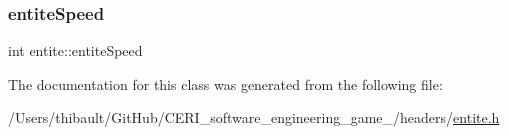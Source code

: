 \subsubsection{\texorpdfstring{entite\+Speed}{entiteSpeed}}
{\footnotesize\ttfamily int entite\+::entite\+Speed\hspace{0.3cm}{\ttfamily [protected]}}



The documentation for this class was generated from the following file\+:\begin{DoxyCompactItemize}
\item 
/\+Users/thibault/\+Git\+Hub/\+C\+E\+R\+I\+\_\+software\+\_\+engineering\+\_\+game\+\_/headers/\hyperlink{entite_8h}{entite.\+h}\end{DoxyCompactItemize}
